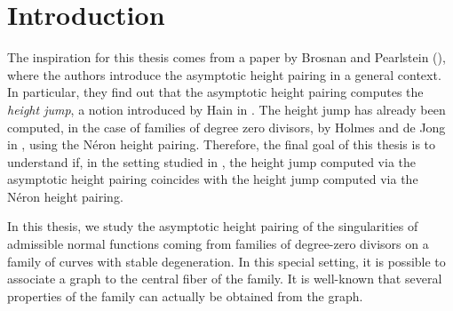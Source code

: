 \documentclass[a4paper,12 pt,titlepage,twoside]{book}
\theoremstyle{plain}
\theoremstyle{theorem}
\theoremstyle{definition}
\theoremstyle{remark}
\begin{document}
	
	
	
\chapter*{Introduction}
	The inspiration for this thesis comes from a paper by Brosnan and Pearlstein (\cite{MR3983292}), where the authors introduce the asymptotic height pairing in a general context. In particular, they find out that the asymptotic height pairing computes the \emph{height jump}, a notion introduced by Hain in \cite{MR2059020}. The height jump has already been computed, in the case of families of degree zero divisors, by Holmes and de Jong in \cite{MR3488379}, using the N{é}ron height pairing. Therefore, the final goal of this thesis is to understand if, in the setting studied in \cite{MR3488379}, the height jump computed via the asymptotic height pairing coincides with the height jump computed via the N{é}ron height pairing.
	
	In this thesis, we study the asymptotic height pairing of the singularities of admissible normal functions coming from families of degree-zero divisors on a family of curves with stable degeneration. In this special setting, it is possible to associate a graph to the central fiber of the family. It is well-known that several properties of the family can actually be obtained from the graph.
	
\end{document}
